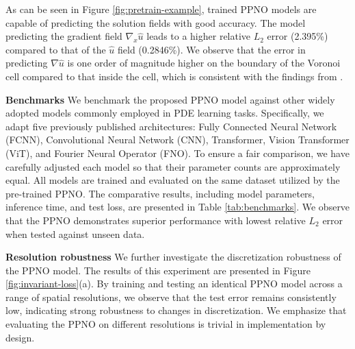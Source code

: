 \documentclass[preprint,11pt]{elsarticle}
\theoremstyle{plain}
\begin{document}

As can be seen in Figure \ref{fig:pretrain-example}, trained PPNO models are capable of predicting the solution fields with good accuracy. The model predicting the gradient field $\nabla_x \hat{u}$ leads to a higher relative $L_2$ error (2.395\%) compared to that of the $\hat{u}$ field (0.2846\%). We observe that the error in predicting $\nabla \hat{u}$ is one order of magnitude higher on the boundary of the Voronoi cell compared to that inside the cell, which is consistent with the findings from \cite{bhattacharya2024learning}.

\textbf{Benchmarks} We benchmark the proposed PPNO model against other widely adopted models commonly employed in PDE learning tasks. Specifically, we adapt five previously published architectures: Fully Connected Neural Network (FCNN), Convolutional Neural Network (CNN), Transformer, Vision Transformer (ViT), and Fourier Neural Operator (FNO). To ensure a fair comparison, we have carefully adjusted each model so that their parameter counts are approximately equal. All models are trained and evaluated on the same dataset utilized by the pre-trained PPNO. The comparative results, including model parameters, inference time, and test loss, are presented in Table \ref{tab:benchmarks}. We observe that the PPNO demonstrates superior performance with lowest relative $L_2$  error when tested against unseen data.

\textbf{Resolution robustness} We further investigate the discretization robustness of the PPNO model. The results of this experiment are presented in Figure \ref{fig:invariant-loss}(a). By training and testing an identical PPNO model across a range of spatial resolutions, we observe that the test error remains consistently low, indicating strong robustness to changes in discretization. We emphasize that evaluating the PPNO on different resolutions is trivial in implementation by design. 
\end{document}
